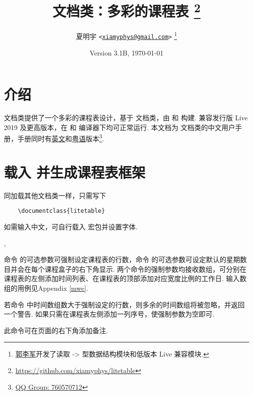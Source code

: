 \documentclass[letterpaper]{l3doc}
\title
{
  \bfseries\cls{litetable} 文档类：多彩的课程表
  \thanks{\url{https://github.com/xiamyphys/litetable}}
}
\author
{
  夏明宇 \texttt{<\href{mailto:xiamyphys@gmail.com}{xiamyphys@gmail.com}>}
  \thanks{\href{https://github.com/ljguo1020}{郭李军}开发了读取 \meta{left} -> \meta{right} 型数据结构模块和低版本 \hologo{TeX} Live 兼容模块.}
}
\date{Version 3.1B, \today}
\begin{document}
\maketitle

\section{介绍}

 文档类提供了一个多彩的课程表设计，基于  文档类，由  和  构建. 兼容发行版  Live 2019 及更高版本，在  和  编译器下均可正常运行. 本文档为  文档类的中文用户手册，手册同时有\href{./litetable-en.pdf}{英文}和\href{./litetable-hk.pdf}{粤语}版本\footnote{\href{https://qm.qq.com/q/RyssAhG4qy}{QQ Group: 760570712}}.

\section{载入  并生成课程表框架}

同加载其他文档类一样，只需写下

\begin{framed}
  \begin{verbatim}
    \documentclass{litetable}
  \end{verbatim}
\end{framed}

如需输入中文，可自行载入  宏包并设置字体.

\begin{function}{\timelist,\weeklist}
  \begin{syntax}
                 
        
  \end{syntax}

  命令  的可选参数可强制设定课程表的行数，命令  的可选参数可设定默认的星期数目并会在每个课程盒子的右下角显示. 两个命令的强制参数均接收数组，可分别在课程表的左侧添加时间列表、在课程表的顶部添加对应宽度比例的工作日. 输入数组的用例见Appendix \ref{mwe}.

  若命令  中时间数组数大于强制设定的行数，则多余的时间数组将被忽略，并返回一个警告. 如果只需在课程表左侧添加一列序号，使强制参数为空即可.
\end{function}

\begin{function}{\more}
  \begin{syntax}
  \end{syntax}

  此命令可在页面的右下角添加备注.
\end{function}
\end{document}
